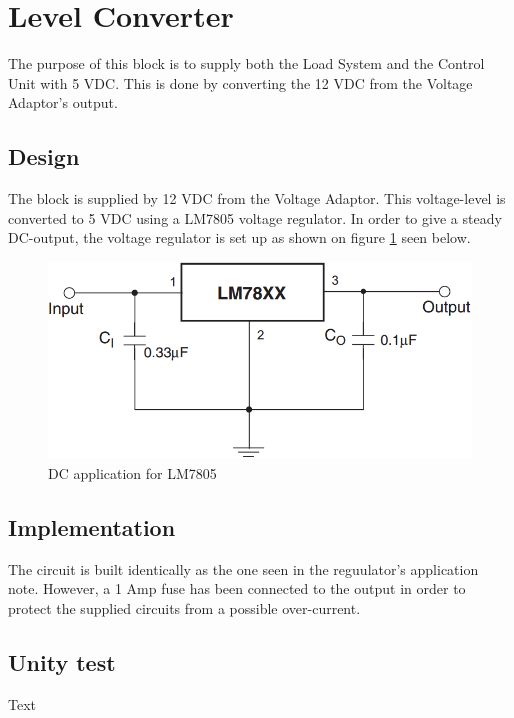 \newpage
\section{Level Converter}
The purpose of this block is to supply both the Load System and the Control Unit with 5 VDC. This is done by converting the 12 VDC from the Voltage Adaptor's output.

\subsection{Design}
The block is supplied by 12 VDC from the Voltage Adaptor. This voltage-level is converted to 5 VDC using a LM7805 voltage regulator. In order to give a steady DC-output, the voltage regulator is set up as shown on figure \ref{fig:LM7805_app} seen below.

\begin{figure}[H]
	\centering
	\includegraphics[width=0.5\linewidth]{Hardware/Pictures/LM7805}
	\caption{DC application for LM7805}
	\label{fig:LM7805_app}
\end{figure}

\subsection{Implementation}
The circuit is built identically as the one seen in the reguulator's application note. However, a 1 Amp fuse has been connected to the output in order to protect the supplied circuits from a possible over-current.

\subsection{Unity test}
Text